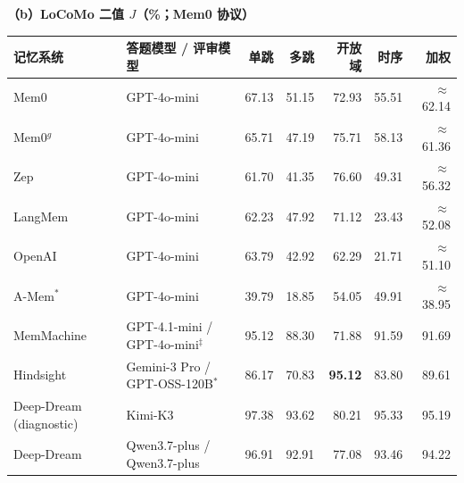 \begin{table}[t]
\vspace{3pt}
{\footnotesize\textbf{（b）LoCoMo 二值 $J$（\%；Mem0 协议）}}\\[1.5pt]
\begin{tabular*}{\textwidth}{@{\extracolsep{\fill}}>{\raggedright\arraybackslash}p{}>{\raggedright\arraybackslash}p{}rrrrr@{}}
\toprule
记忆系统 & 答题模型 / 评审模型 & 单跳 & 多跳 & 开放域 & 时序 & 加权 \\
\midrule
Mem0 & GPT-4o-mini & 67.13 & 51.15 & 72.93 & 55.51 & $\approx$62.14 \\
Mem0$^g$ & GPT-4o-mini & 65.71 & 47.19 & 75.71 & 58.13 & $\approx$61.36 \\
Zep & GPT-4o-mini & 61.70 & 41.35 & 76.60 & 49.31 & $\approx$56.32 \\
LangMem & GPT-4o-mini & 62.23 & 47.92 & 71.12 & 23.43 & $\approx$52.08 \\
OpenAI & GPT-4o-mini & 63.79 & 42.92 & 62.29 & 21.71 & $\approx$51.10 \\
A-Mem$^*$ & GPT-4o-mini & 39.79 & 18.85 & 54.05 & 49.91 & $\approx$38.95 \\
\midrule
\rowcolor{green!9}
MemMachine & GPT-4.1-mini / GPT-4o-mini$^\ddagger$ & 95.12 & 88.30 & 71.88 & 91.59 & 91.69 \\
\rowcolor{green!9}
Hindsight & Gemini-3 Pro / GPT-OSS-120B$^\ast$ & 86.17 & 70.83 & \textbf{95.12} & 83.80 & 89.61 \\
\midrule
\rowcolor{blue!9}
Deep-Dream (diagnostic) & Kimi-K3 & 97.38 & 93.62 & 80.21 & 95.33 & 95.19 \\
\rowcolor{blue!9}
Deep-Dream & Qwen3.7-plus / Qwen3.7-plus & 96.91 & 92.91 & 77.08 & 93.46 & 94.22 \\
\bottomrule
\end{tabular*}


\end{table}
